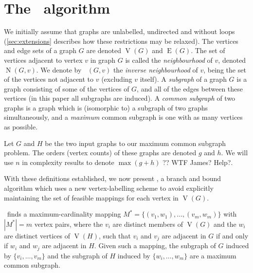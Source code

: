 \documentclass[letterpaper]{article}
\newcommand{\McSplit}{\textproc{McSplit}}
\DeclareMathOperator{\V}{V}
\DeclareMathOperator{\E}{E}
\DeclareMathOperator{\N}{N}
\DeclareMathOperator{\invN}{\overline{N}}
\begin{document}
\section{The \McSplit\ algorithm}

We initially assume that graphs are unlabelled, undirected and without loops
(\cref{sec:extensions} describes how these restrictions may be relaxed).
The vertices and edge sets of a graph $G$ are denoted $\V(G)$ and $\E(G)$.  The
set of vertices adjacent to vertex $v$ in graph $G$ is called the
\emph{neighbourhood} of $v$, denoted $\N(G, v)$. We denote by $\invN(G, v)$ the
\emph{inverse neighbourhood} of $v$, being the set of the vertices not adjacent
to $v$ (excluding $v$ itself). A \emph{subgraph} of a graph $G$ is a graph
consisting of some of the vertices of $G$, and all of the edges between these
vertices (in this paper all subgraphs are induced). A \emph{common subgraph} of
two graphs is a graph which is (isomorphic to) a subgraph of two graphs
simultaneously, and a \emph{maximum} common subgraph is one with as many
vertices as possible.

Let $G$ and $H$ be the two input graphs to our maximum common subgraph problem.
The orders (vertex counts) of these graphs are denoted $g$ and $h$. We will
use $n$ in complexity results to denote $\max(g + h)$ ?? WTF James? Help?.

With these definitions established, we now present \McSplit, a branch and bound
algorithm which uses a new vertex-labelling scheme to avoid explicitly
maintaining the set of feasible mappings for each vertex in $\V(G)$.

\McSplit\ finds a maximum-cardinality mapping $M^* = \{(v_1, w_1), \dots,
(v_{m}, w_{m})\}$ with $|M^*| = m$ vertex pairs, where the $v_i$ are distinct members of $\V(G)$ and the
$w_i$ are distinct vertices of $\V(H)$, such that $v_i$ and $v_j$ are adjacent
in $G$ if and only if $w_i$ and $w_j$ are adjacent in $H$. 
Given such a mapping, the subgraph of $G$ induced by $\{v_i, \dots, v_{m}\}$
and the subgraph of $H$ induced by $\{w_i, \dots, w_{m}\}$ are a maximum
common subgraph.
\end{document}
